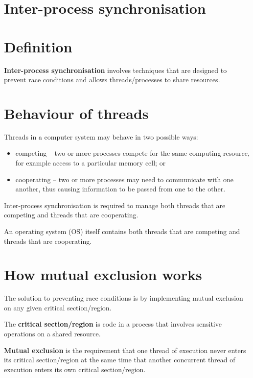 \documentclass[a4paper]{systems-software}
\begin{document}
\section{Inter-process synchronisation}

\section*{Definition}

\textbf{Inter-process synchronisation} involves techniques that are designed to prevent race conditions and allows threads/processes to share resources.


\section*{Behaviour of threads}

Threads in a computer system may behave in two possible ways:
\begin{itemize}
	\item competing -- two or more processes compete for the same computing resource, for example access to a particular memory cell; or
	\item cooperating -- two or more processes may need to communicate with one another, thus causing information to be passed from one to the other.
\end{itemize}

Inter-process synchronisation is required to manage both threads that are competing and threads that are cooperating.

An operating system (OS) itself contains both threads that are competing and threads that are cooperating.


\section*{How mutual exclusion works}

The solution to preventing race conditions is by implementing mutual exclusion on any given critical section/region.

The \textbf{critical section/region} is code in a process that involves sensitive operations on a shared resource.

\textbf{Mutual exclusion} is the requirement that one thread of execution never enters its critical section/region at the same time that another concurrent thread of execution enters its own critical section/region.
\end{document}
